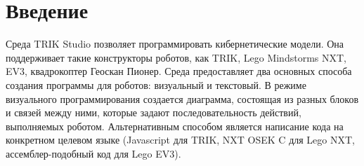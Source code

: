 \documentclass[14pt]{matmex-diploma}
\begin{document}
\maketitle
\tableofcontents
\section*{Введение}
Среда TRIK Studio позволяет программировать кибернетические модели.
Она поддерживает такие конструкторы роботов, как TRIK, Lego Mindstorms NXT, EV3,
квадрокоптер Геоскан Пионер.
Среда предоставляет
два основных способа создания программы для роботов:
визуальный и текстовый. В режиме визуального программирования
создается диаграмма, 
состоящая из разных блоков и связей между ними, которые
задают последовательность действий, выполняемых роботом. Альтернативным 
способом является написание кода на конкретном целевом языке 
(Javascript для TRIK, NXT OSEK C для Lego NXT, 
ассемблер-подобный код для Lego EV3).
\end{document}
